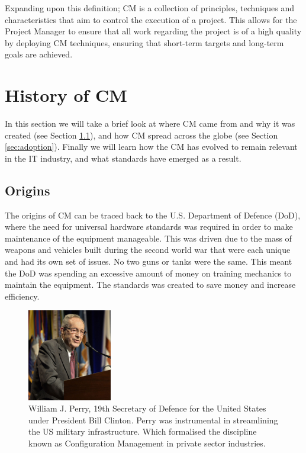\documentclass[cmpstyle]{ueacmpstyle}
\begin{document}
		Expanding upon this definition; CM is a collection of principles, techniques and characteristics that aim to control the execution of a project. This allows for the Project Manager to ensure that all work regarding the project is of a high quality by deploying CM techniques, ensuring that short-term targets and long-term goals are achieved.
	
	\section{History of CM} \label{sec:history}
	In this section we will take a brief look at where CM came from and why it was created (see Section \ref{sec:origin}), and how CM spread across the globe (see Section \ref{sec:adoption}). Finally we will learn how the CM has evolved to remain relevant in the IT industry, and what standards have emerged as a result.
	
		\subsection{Origins} \label{sec:origin}
		The origins of CM can be traced back to the U.S. Department of Defence (DoD), where the need for universal hardware standards was required in order to make maintenance of the equipment manageable. This was driven due to the mass of weapons and vehicles built during the second world war that were each unique and had its own set of issues. No two guns or tanks were the same. This meant the DoD was spending an excessive amount of money on training mechanics to maintain the equipment. The standards was created to save money and increase efficiency.
		
		\begin{figure}
			\centering
			\includegraphics[height=4cm]{images/william-perry.jpg}
			\caption{William J. Perry, 19th Secretary of Defence for the United States under President Bill Clinton. Perry was instrumental in streamlining the US military infrastructure. Which formalised the discipline known as Configuration Management in private sector industries.}
		\end{figure}
	
\end{document}
